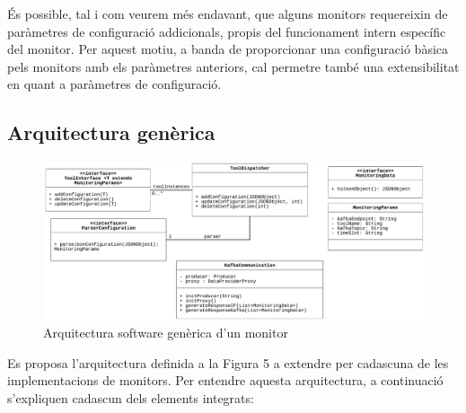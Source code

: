 És possible, tal i com veurem més endavant, que alguns monitors requereixin de paràmetres de configuració addicionals, propis del funcionament intern específic del monitor. Per aquest motiu, a banda de proporcionar una configuració bàsica pels monitors amb els paràmetres anteriors, cal permetre també una extensibilitat en quant a paràmetres de configuració.

\subsection{Arquitectura genèrica}

\begin{figure}
\centering
\includegraphics[width=14cm]{Figures/Figure5}
\decoRule
\caption[Arquitectura software genèrica d'un monitor]{Arquitectura software genèrica d'un monitor}
\label{fig:Figura5}
\end{figure}

Es proposa l'arquitectura definida a la Figura 5 a extendre per cadascuna de les implementacions de monitors. Per entendre aquesta arquitectura, a continuació s'expliquen cadascun dels elements integrats:

